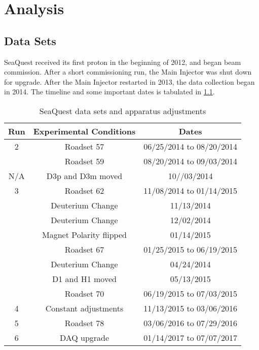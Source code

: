 \documentclass[../main.tex]{subfiles}
\begin{document}
\ifSubfilesClassLoaded{
	\mainmatter
	\setcounter{chapter}{4}
}{}

\chapter{Analysis}
\label{ch:analysis}

\section{Data Sets}
SeaQuest received its first proton in the beginning of 2012, and began beam
commission. After a short commissioning run, the Main Injector was shut down for
upgrade. After the Main Injector restarted in 2013, the data collection began in
2014. The timeline and some important dates is tabulated in \cref{tab:dataset}.
\begin{table}[h!]
	\centering
	\begin{tabular}{ c c c }
		\hline
		Run & Experimental Conditions & Dates                    \\
		\hline
		2   & Roadset 57              & 06/25/2014 to 08/20/2014 \\
		    & Roadset 59              & 08/20/2014 to 09/03/2014 \\
		\hline
		N/A & D3p and D3m moved       & 10//03/2014              \\
		\hline
		3   & Roadset 62              & 11/08/2014 to 01/14/2015 \\
		    & Deuterium Change        & 11/13/2014               \\
		    & Deuterium Change        & 12/02/2014               \\
		    & Magnet Polarity flipped & 01/14/2015               \\
		    & Roadset 67              & 01/25/2015 to 06/19/2015 \\
		    & Deuterium Change        & 04/24/2014               \\
		    & D1 and H1 moved         & 05/13/2015               \\
		    & Roadset 70              & 06/19/2015 to 07/03/2015 \\
		\hline
		4   & Constant adjustments    & 11/13/2015 to 03/06/2016 \\
		5   & Roadset 78              & 03/06/2016 to 07/29/2016 \\
		6   & DAQ upgrade             & 01/14/2017 to 07/07/2017 \\
	\end{tabular}
	\caption{SeaQuest data sets and apparatus adjustments}
	\label{tab:dataset}
\end{table}
\end{document}
